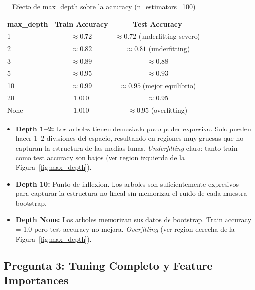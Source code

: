 \documentclass[12pt,a4paper]{article}
\begin{document}
\begin{table}[H]
  \centering
  \caption{Efecto de max\_depth sobre la accuracy (n\_estimators=100)}
  \label{tab:max_depth}
  \begin{tabular}{lcc}
    \toprule
    \textbf{max\_depth} & \textbf{Train Accuracy} & \textbf{Test Accuracy} \\
    \midrule
    1    & $\approx 0.72$ & $\approx 0.72$ (underfitting severo) \\
    2    & $\approx 0.82$ & $\approx 0.81$ (underfitting) \\
    3    & $\approx 0.89$ & $\approx 0.88$ \\
    5    & $\approx 0.95$ & $\approx 0.93$ \\
    10   & $\approx 0.99$ & $\approx 0.95$ (mejor equilibrio) \\
    20   & $1.000$        & $\approx 0.95$ \\
    None & $1.000$        & $\approx 0.95$ (overfitting) \\
    \bottomrule
  \end{tabular}
\end{table}

\begin{tcolorbox}[warnbox, title={max\_depth es el principal driver de overfitting/underfitting}]
  \begin{itemize}
    \item \textbf{Depth 1--2:} Los arboles tienen demasiado poco poder expresivo. Solo pueden
      hacer 1--2 divisiones del espacio, resultando en regiones muy gruesas que no capturan la
      estructura de las medias lunas. \textit{Underfitting} claro: tanto train como test accuracy
      son bajos (ver region izquierda de la Figura~\ref{fig:max_depth}).
    \item \textbf{Depth 10:} Punto de inflexion. Los arboles son suficientemente expresivos para
      capturar la estructura no lineal sin memorizar el ruido de cada muestra bootstrap.
    \item \textbf{Depth None:} Los arboles memorizan sus datos de bootstrap. Train accuracy = 1.0
      pero test accuracy no mejora. \textit{Overfitting} (ver region derecha de la
      Figura~\ref{fig:max_depth}).
  \end{itemize}
\end{tcolorbox}

\subsection{Pregunta 3: Tuning Completo y Feature Importances}
\end{document}
